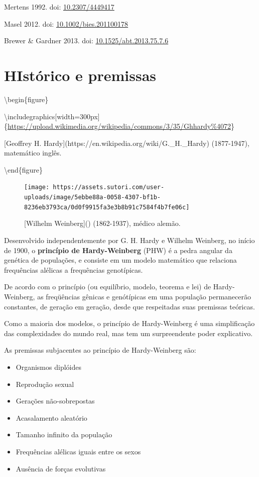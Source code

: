 \documentclass[
]{book}
\begin{document}
Mertens 1992. doi: \href{https://doi.org/10.2307/4449417}{10.2307/4449417}

Masel 2012. doi: \href{https://doi.org/10.1002/bies.201100178}{10.1002/bies.201100178}

Brewer \& Gardner 2013. doi: \href{https://doi.org/10.1002/bies.201100178}{10.1525/abt.2013.75.7.6}

\hypertarget{histuxf3rico-e-premissas}{%
\section{HIstórico e premissas}\label{histuxf3rico-e-premissas}}

\textbackslash begin\{figure\}

\hfill{}\textbackslash includegraphics{[}width=300px{]}\{\url{https://upload.wikimedia.org/wikipedia/commons/3/35/Ghhardy\%4072}\}

\caption{[Geoffrey H. Hardy](https://en.wikipedia.org/wiki/G._H._Hardy) (1877-1947), matemático inglês.}

\label{fig:hardy}
\textbackslash end\{figure\}

\begin{figure}

\hfill{}\texttt{[image: https://assets.sutori.com/user-uploads/image/5ebbe88a-0058-4307-bf1b-8236eb3793ca/0d0f9915fa3e3b8b91c7584f4b7fe06c]} 

\caption{[Wilhelm Weinberg]() (1862-1937), médico alemão.}\label{fig:weinberg}
\end{figure}

Desenvolvido independentemente por G. H. Hardy e Wilhelm Weinberg, no início de 1900, o \textbf{princípio de Hardy-Weinberg} (PHW) é a pedra angular da genética de populações, e consiste em um modelo matemático que relaciona frequências alélicas a frequências genotípicas.

De acordo com o princípio (ou equilíbrio, modelo, teorema e lei) de Hardy-Weinberg, as freqüências gênicas e genótípicas em uma população permanecerão constantes, de geração em geração, desde que respeitadas suas premissas teóricas.

Como a maioria dos modelos, o princípio de Hardy-Weinberg é uma simplificação das complexidades do mundo real, mas tem um surpreendente poder explicativo.

As premissas subjacentes ao princípio de Hardy-Weinberg são:

\begin{itemize}
\item
  Organismos diplóides
\item
  Reprodução sexual
\item
  Gerações não-sobrepostas
\item
  Acasalamento aleatório
\item
  Tamanho infinito da população
\item
  Frequências alélicas iguais entre os sexos
\item
  Ausência de forças evolutivas
\end{itemize}
\end{document}
